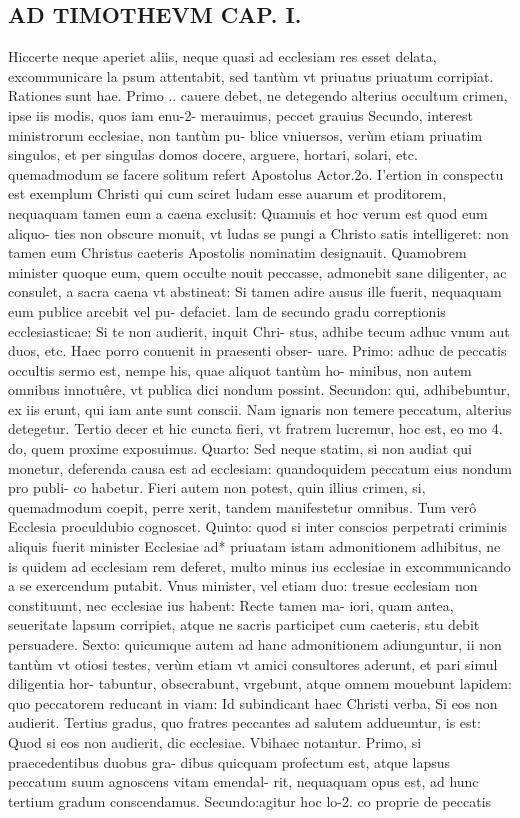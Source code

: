 \documentclass{article}
\begin{document}
\begin{pages}
\section*{AD TIMOTHEVM CAP. I. }
\marginpar{[ p.65 ]}
\marginpar{[ p.66 ]}\pstart Hiccerte neque  aperiet aliis, neque  quasi ad ecclesiam res esset delata, excommunicare la psum attentabit, sed tantùm vt priuatus priuatum corripiat. Rationes sunt hae. Primo .. cauere debet, ne detegendo alterius occultum crimen, ipse iis modis, quos iam enu-2- merauimus, peccet grauius Secundo, interest ministrorum ecclesiae, non tantùm pu- blice vniuersos, verùm etiam priuatim singulos, et per singulas domos docere, arguere, hortari, solari, etc. quemadmodum se facere solitum refert Apostolus Actor.2o. I'ertion in conspectu est exemplum Christi qui cum sciret ludam esse auarum et proditorem, nequaquam tamen eum a caena exclusit: Quamuis et hoc verum est quod eum aliquo- ties non obscure monuit, vt ludas se pungi a Christo satis intelligeret: non tamen eum Christus caeteris Apostolis nominatim designauit. Quamobrem minister quoque  eum, quem occulte nouit peccasse, admonebit sane diligenter, ac consulet, a sacra caena vt abstineat: Si tamen adire ausus ille fuerit, nequaquam eum publice arcebit vel pu- defaciet.  \pend\pstart lam de secundo gradu correptionis ecclesiasticae: Si te non audierit, inquit Chri- stus, adhibe tecum adhuc vnum aut duos, etc. Haec porro conuenit in praesenti obser- uare. Primo: adhuc de peccatis occultis sermo est, nempe his, quae aliquot tantùm ho- minibus, non autem omnibus innotuêre, vt publica dici nondum possint. Secundon: qui, adhibebuntur, ex iis erunt, qui iam ante sunt conscii. Nam ignaris non temere peccatum, alterius detegetur. Tertio decer et hic cuncta fieri, vt fratrem lucremur, hoc est, eo mo 4. do, quem proxime exposuimus. Quarto: Sed neque  statim, si non audiat qui monetur, deferenda causa est ad ecclesiam: quandoquidem peccatum eius nondum pro publi- co habetur. Fieri autem non potest, quin illius crimen, si, quemadmodum coepit, perre xerit, tandem manifestetur omnibus. Tum verô Ecclesia proculdubio cognoscet. Quinto: quod si inter conscios perpetrati criminis aliquis fuerit minister Ecclesiae ad* priuatam istam admonitionem adhibitus, ne is quidem ad ecclesiam rem deferet, multo minus ius ecclesiae in excommunicando a se exercendum putabit. Vnus minister, vel etiam duo: tresue ecclesiam non constituunt, nec ecclesiae ius habent: Recte tamen ma- iori, quam antea, seueritate lapsum corripiet, atque  ne sacris participet cum caeteris, stu debit persuadere. Sexto: quicumque  autem ad hanc admonitionem adiunguntur, ii non tantùm vt otiosi testes, verùm etiam vt amici consultores aderunt, et pari simul diligentia hor- tabuntur, obsecrabunt, vrgebunt, atque  omnem mouebunt lapidem: quo peccatorem reducant in viam: Id subindicant haec Christi verba, Si eos non audierit.  \pend\pstart Tertius gradus, quo fratres peccantes ad salutem addueuntur, is est: Quod si eos non audierit, dic ecclesiae. Vbihaec notantur. Primo, si praecedentibus duobus gra- dibus quicquam profectum est, atque  lapsus peccatum suum agnoscens vitam emendal- rit, nequaquam opus est, ad hunc tertium gradum conscendamus. Secundo:agitur hoc lo-2.  co proprie de peccatis 
\end{pages}
\end{document}
